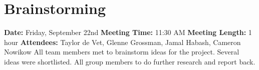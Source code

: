 \section{Brainstorming}
\textbf{Date:} Friday, September 22nd
\newline
\textbf{Meeting Time:} 11:30 AM
\newline
\textbf{Meeting Length:} 1 hour
\newline
\textbf{Attendees:} Taylor de Vet, Glenne Grossman, Jamal Habash, Cameron Nowikow
\newline
\newline
All team members met to brainstorm ideas for the project.
Several ideas were shortlisted.
All group members to do further research and report back.
